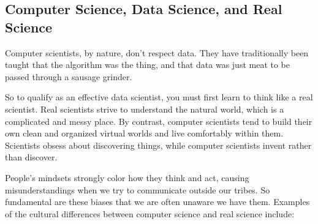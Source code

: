 \documentclass[10pt]{article}
\begin{document}
\subsection*{Computer Science, Data Science, and Real Science}
Computer scientists, by nature, don't respect data. They have traditionally been taught that the algorithm was the thing, and that data was just meat to be passed through a sausage grinder.

So to qualify as an effective data scientist, you must first learn to think like a real scientist. Real scientists strive to understand the natural world, which is a complicated and messy place. By contrast, computer scientists tend to build their own clean and organized virtual worlds and live comfortably within them. Scientists obsess about discovering things, while computer scientists invent rather than discover.

People's mindsets strongly color how they think and act, causing misunderstandings when we try to communicate outside our tribes. So fundamental are these biases that we are often unaware we have them. Examples of the cultural differences between computer science and real science include:
\end{document}
